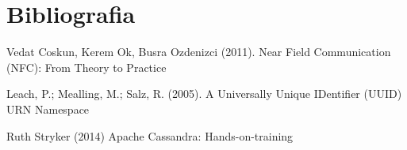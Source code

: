 \section{Bibliografia}
\begin{enumerate}[label={[\arabic*]}]
\item Vedat Coskun, Kerem Ok, Busra Ozdenizci (2011). Near Field Communication (NFC): From Theory to Practice 
\item Leach, P.; Mealling, M.; Salz, R. (2005). A Universally Unique IDentifier (UUID) URN Namespace
\item Ruth Stryker (2014) Apache Cassandra: Hands-on-training
\end{enumerate}